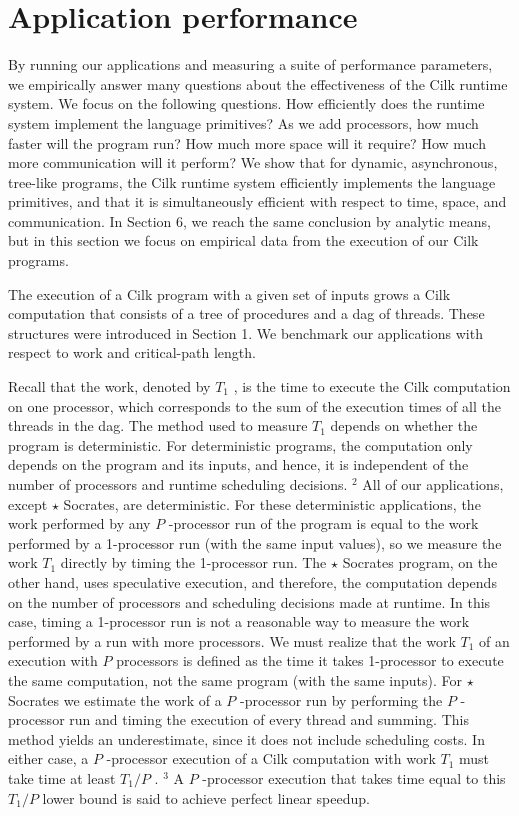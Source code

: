 \documentclass[
]{article}
\begin{document}
\section{Application performance}\label{application-performance}

By running our applications and measuring a suite of performance
parameters, we empirically answer many questions about the effectiveness
of the Cilk runtime system. We focus on the following questions. How
efficiently does the runtime system implement the language primitives?
As we add processors, how much faster will the program run? How much
more space will it require? How much more communication will it perform?
We show that for dynamic, asynchronous, tree-like programs, the Cilk
runtime system efficiently implements the language primitives, and that
it is simultaneously efficient with respect to time, space, and
communication. In Section 6, we reach the same conclusion by analytic
means, but in this section we focus on empirical data from the execution
of our Cilk programs.

The execution of a Cilk program with a given set of inputs grows a Cilk
computation that consists of a tree of procedures and a dag of threads.
These structures were introduced in Section 1. We benchmark our
applications with respect to work and critical-path length.

Recall that the work, denoted by \(T_{1}\) , is the time to execute the
Cilk computation on one processor, which corresponds to the sum of the
execution times of all the threads in the dag. The method used to
measure \(T_{1}\) depends on whether the program is deterministic. For
deterministic programs, the computation only depends on the program and
its inputs, and hence, it is independent of the number of processors and
runtime scheduling decisions. \(^{2}\) All of our applications, except
\(\star\) Socrates, are deterministic. For these deterministic
applications, the work performed by any \(P\) -processor run of the
program is equal to the work performed by a 1-processor run (with the
same input values), so we measure the work \(T_{1}\) directly by timing
the 1-processor run. The \(\star\) Socrates program, on the other hand,
uses speculative execution, and therefore, the computation depends on
the number of processors and scheduling decisions made at runtime. In
this case, timing a 1-processor run is not a reasonable way to measure
the work performed by a run with more processors. We must realize that
the work \(T_{1}\) of an execution with \(P\) processors is defined as
the time it takes 1-processor to execute the same computation, not the
same program (with the same inputs). For \(\star\) Socrates we estimate
the work of a \(P\) -processor run by performing the \(P\) -processor
run and timing the execution of every thread and summing. This method
yields an underestimate, since it does not include scheduling costs. In
either case, a \(P\) -processor execution of a Cilk computation with
work \(T_{1}\) must take time at least \(T_{1}/P\) . \(^{3}\) A \(P\)
-processor execution that takes time equal to this \(T_{1}/P\) lower
bound is said to achieve perfect linear speedup.
\end{document}
